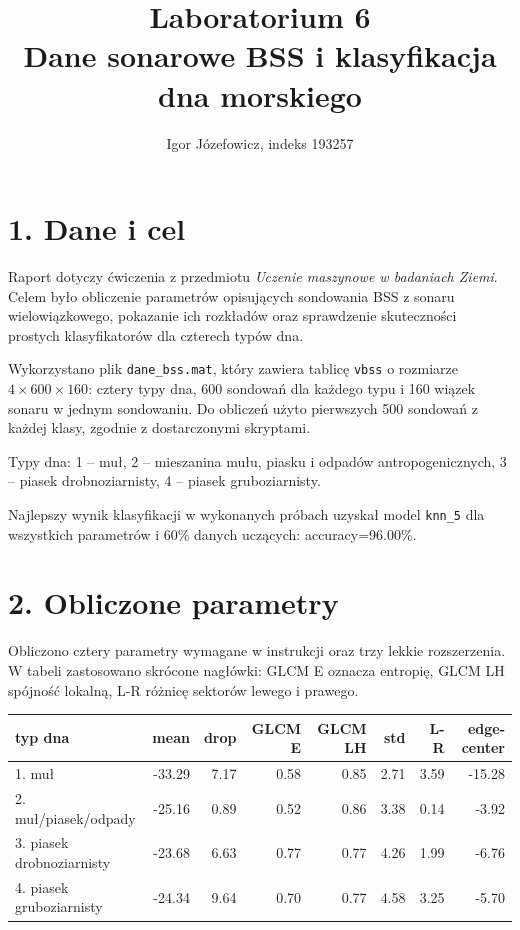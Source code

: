 \documentclass[11pt,a4paper]{article}
\title{Laboratorium 6\\Dane sonarowe BSS i klasyfikacja dna morskiego}
\author{Igor Józefowicz, indeks 193257}
\date{}
\begin{document}
\maketitle

\section*{1. Dane i cel}
Raport dotyczy ćwiczenia z przedmiotu \emph{Uczenie maszynowe w badaniach Ziemi}. Celem było obliczenie parametrów opisujących sondowania BSS z sonaru wielowiązkowego, pokazanie ich rozkładów oraz sprawdzenie skuteczności prostych klasyfikatorów dla czterech typów dna.

Wykorzystano plik \texttt{dane\_bss.mat}, który zawiera tablicę \texttt{vbss} o rozmiarze \(4 \times 600 \times 160\): cztery typy dna, 600 sondowań dla każdego typu i 160 wiązek sonaru w jednym sondowaniu. Do obliczeń użyto pierwszych 500 sondowań z każdej klasy, zgodnie z dostarczonymi skryptami.

Typy dna: 1 -- muł, 2 -- mieszanina mułu, piasku i odpadów antropogenicznych, 3 -- piasek drobnoziarnisty, 4 -- piasek gruboziarnisty.

Najlepszy wynik klasyfikacji w wykonanych próbach uzyskał model \texttt{knn\_5} dla wszystkich parametrów i 60\% danych uczących: accuracy=96.00\%.

\section*{2. Obliczone parametry}
Obliczono cztery parametry wymagane w instrukcji oraz trzy lekkie rozszerzenia. W tabeli zastosowano skrócone nagłówki: GLCM E oznacza entropię, GLCM LH spójność lokalną, L-R różnicę sektorów lewego i prawego.

\begin{table}[H]
\centering
\scriptsize
\begin{tabular}{lrrrrrrr}
\toprule
typ dna & mean & drop & GLCM E & GLCM LH & std & L-R & edge-center \\
\midrule
1. muł & -33.29 & 7.17 & 0.58 & 0.85 & 2.71 & 3.59 & -15.28 \\
2. muł/piasek/odpady & -25.16 & 0.89 & 0.52 & 0.86 & 3.38 & 0.14 & -3.92 \\
3. piasek drobnoziarnisty & -23.68 & 6.63 & 0.77 & 0.77 & 4.26 & 1.99 & -6.76 \\
4. piasek gruboziarnisty & -24.34 & 9.64 & 0.70 & 0.77 & 4.58 & 3.25 & -5.70 \\
\bottomrule
\end{tabular}
\end{table}
\end{document}
